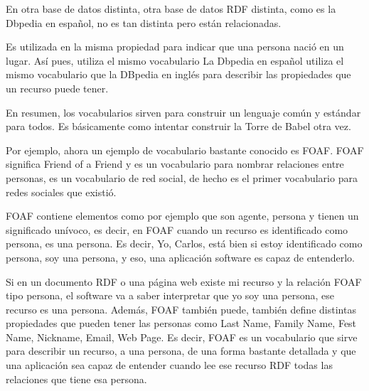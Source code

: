En otra base de datos distinta, otra base de datos RDF distinta, como es la Dbpedia en español, no es tan distinta pero están relacionadas.

Es utilizada en la misma propiedad para indicar que una persona nació en un lugar. Así pues, utiliza el mismo vocabulario La Dbpedia en español utiliza el mismo vocabulario que la DBpedia en inglés para describir las propiedades que un recurso puede tener.

En resumen, los vocabularios sirven para construir un lenguaje común y estándar para todos. Es básicamente como intentar construir la Torre de Babel otra vez.

Por ejemplo, ahora un ejemplo de vocabulario bastante conocido es FOAF. FOAF significa Friend of a Friend y es un vocabulario para nombrar relaciones entre personas, es un vocabulario de red social, de hecho es el primer vocabulario para redes sociales que existió.

FOAF contiene elementos como por ejemplo que son agente, persona y tienen un significado unívoco, es decir, en FOAF cuando un recurso es identificado como persona, es una persona. Es decir, Yo, Carlos, está bien si estoy identificado como persona, soy una persona, y eso, una aplicación software es capaz de entenderlo.

Si en un documento RDF o una página web existe mi recurso y la relación FOAF tipo persona, el software va a saber interpretar que yo soy una persona, ese recurso es una persona. Además, FOAF también puede, también define distintas propiedades que pueden tener las personas como Last Name, Family Name, Fest Name, Nickname, Email, Web Page. Es decir, FOAF es un vocabulario que sirve para describir un recurso, a una persona, de una forma bastante detallada y que una aplicación sea capaz de entender cuando lee ese recurso RDF todas las relaciones que tiene esa persona.

